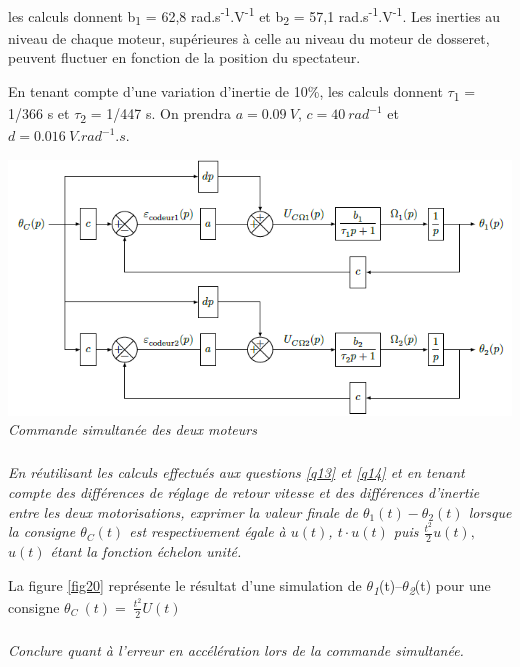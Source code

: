 \documentclass[10pt,fleqn]{article} %
\begin{document}
\begin{multicols}{2}
les calculs donnent b\textsubscript{1} = 62,8
rad.s\textsuperscript{-1}.V\textsuperscript{-1} et b\textsubscript{2} =
57,1 rad.s\textsuperscript{-1}.V\textsuperscript{-1}. Les inerties au
niveau de chaque moteur, supérieures à celle au niveau du moteur de
dosseret, peuvent fluctuer en fonction de la position du spectateur.

En tenant compte d'une variation d'inertie de 10\%, les calculs donnent
$\tau$\textsubscript{1} = 1/366 s et $\tau$\textsubscript{2} = 1/447 s. On prendra
$a =\SI{0,09}{V}$, $c =\SI{40}{rad^{-1}}$ et $d = \SI{0,016}{V.rad^{-1}.s}$.


\begin{center}
\includegraphics[width=1.0\linewidth]{images/image20.png}
\textit{Commande simultanée des deux moteurs \label{fig19}}
\end{center}


\subparagraph{}\textit{En réutilisant les calculs effectués aux questions \ref{q13} et \ref{q14} et en
  tenant compte des différences de réglage de retour vitesse et des
  différences d'inertie entre les deux motorisations, exprimer la valeur
  finale de $\theta_1(t)-\theta_2(t)$ lorsque la consigne $\theta_C(t)$ est respectivement
  égale à $u(t)$, $t\cdot u(t)$ puis \(\frac{t^{2}}{2}u(t),\) $u(t)$ étant la
  fonction échelon unité.}
\ifprof
\begin{corrige}
\end{corrige}
\else
\fi

La figure \ref{fig20} représente le résultat d'une simulation de
$\theta$\emph{\textsubscript{1}}(t)--$\theta$\emph{\textsubscript{2}}(t) pour une
consigne \(\theta_{C}\ \left( t \right) = \ \frac{t^{2}}{2}U(t)\)

\subparagraph{}\textit{Conclure quant à l'erreur en accélération lors de la commande
  simultanée.}
\ifprof
\begin{corrige}
\end{corrige}
\else
\fi



\end{multicols}
\end{document}
